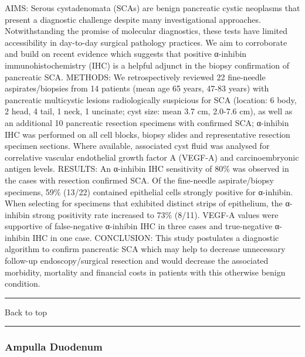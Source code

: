 \documentclass[]{article}
\begin{document}
AIMS: Serous cystadenomata (SCAs) are benign pancreatic cystic neoplasms
that present a diagnostic challenge despite many investigational
approaches. Notwithstanding the promise of molecular diagnostics, these
tests have limited accessibility in day-to-day surgical pathology
practices. We aim to corroborate and build on recent evidence which
suggests that positive α-inhibin immunohistochemistry (IHC) is a helpful
adjunct in the biopsy confirmation of pancreatic SCA. METHODS: We
retrospectively reviewed 22 fine-needle aspirates/biopsies from 14
patients (mean age 65 years, 47-83 years) with pancreatic multicystic
lesions radiologically suspicious for SCA (location: 6 body, 2 head, 4
tail, 1 neck, 1 uncinate; cyst size: mean 3.7 cm, 2.0-7.6 cm), as well
as an additional 10 pancreatic resection specimens with confirmed SCA;
α-inhibin IHC was performed on all cell blocks, biopsy slides and
representative resection specimen sections. Where available, associated
cyst fluid was analysed for correlative vascular endothelial growth
factor A (VEGF-A) and carcinoembryonic antigen levels. RESULTS: An
α-inhibin IHC sensitivity of 80\% was observed in the cases with
resection confirmed SCA. Of the fine-needle aspirate/biopsy specimens,
59\% (13/22) contained epithelial cells strongly positive for α-inhibin.
When selecting for specimens that exhibited distinct strips of
epithelium, the α-inhibin strong positivity rate increased to 73\%
(8/11). VEGF-A values were supportive of false-negative α-inhibin IHC in
three cases and true-negative α-inhibin IHC in one case. CONCLUSION:
This study postulates a diagnostic algorithm to confirm pancreatic SCA
which may help to decrease unnecessary follow-up endoscopy/surgical
resection and would decrease the associated morbidity, mortality and
financial costs in patients with this otherwise benign condition.

{}

{}

\begin{center}\rule{0.5\linewidth}{\linethickness}\end{center}

Back to top

\begin{center}\rule{0.5\linewidth}{\linethickness}\end{center}

\pagebreak

\hypertarget{ampulla-duodenum}{%
\subsubsection{Ampulla Duodenum}\label{ampulla-duodenum}}
\end{document}
